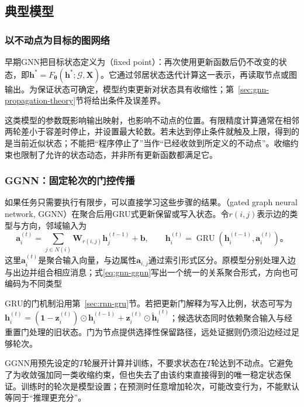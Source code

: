 \subsection{典型模型}
\label{sec:gnn-recurrent-models}

\subsubsection{以不动点为目标的图网络}
\label{sec:gnn-fixed-point-model}

早期GNN把目标状态定义为（fixed point）：再次使用更新函数后仍不改变的状态，即$\bm{h}^*=F_{\bm{\theta}}(\bm{h}^*;\mathcal{G},\bm{X})$。它通过邻居状态迭代计算这一表示，再读取节点或图输出。为保证状态可确定，模型约束更新对状态具有收缩性；第~\ref{sec:gnn-propagation-theory}节将给出条件及误差界。

这类模型的参数既影响输出映射，也影响不动点的位置。有限精度计算通常在相邻两轮差小于容差时停止，并设置最大轮数。若未达到停止条件就触及上限，得到的是当前近似状态；不能把“程序停止了”当作“已经收敛到所定义的不动点”。收缩约束也限制了允许的状态动态，并非所有更新函数都满足它。

\subsubsection{GGNN：固定轮次的门控传播}
\label{sec:gnn-ggnn}

如果任务只需要执行有限步，可以直接学习这些步骤的结果。（gated graph neural network, GGNN）在聚合后用GRU式更新保留或写入状态。令$r(i,j)$表示边的类型与方向，邻域输入为
\begin{equation}
  \bm{a}_i^{(t)}=\sum_{j\in N(i)}\bm{W}_{r(i,j)}\bm{h}_j^{(t-1)}+\bm{b},
  \qquad
  \bm{h}_i^{(t)}=\operatorname{GRU}(\bm{h}_i^{(t-1)},\bm{a}_i^{(t)})\text{。}
  \label{eq:gnn-ggnn}
\end{equation}
这里$\bm{a}_i^{(t)}$是聚合输入向量，与边属性$\bm{a}_{i,j}$通过索引形式区分。原模型分别处理入边与出边并组合相应消息；式\eqref{eq:gnn-ggnn}写出一个统一的关系聚合形式，方向也可编码为不同类型

GRU的门机制沿用第~\ref{sec:rnn-gru}节。若把更新门解释为写入比例，状态可写为$\bm{h}_i^{(t)}=(\bm{1}-\bm{z}_i^{(t)})\odot\bm{h}_i^{(t-1)}+\bm{z}_i^{(t)}\odot\widetilde{\bm{h}}_i^{(t)}$；候选状态同时依赖聚合输入与经重置门处理的旧状态。门为节点提供选择性保留路径，远处证据则仍须沿边经过足够轮次。

GGNN用预先设定的$T$轮展开计算并训练，不要求状态在$T$轮达到不动点。它避免了为收敛强加同一类收缩约束，但也失去了由该约束直接得到的唯一稳定状态保证。训练时的轮次是模型设置；在预测时任意增加轮次，可能改变行为，不能默认等同于“推理更充分”。

